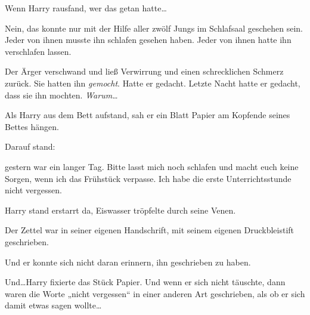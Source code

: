 Wenn Harry rausfand, wer das getan hatte…

Nein, das konnte nur mit der Hilfe aller zwölf Jungs im Schlafsaal geschehen sein. Jeder von ihnen musste ihn schlafen gesehen haben. Jeder von ihnen hatte ihn verschlafen lassen.

Der Ärger verschwand und ließ Verwirrung und einen schrecklichen Schmerz zurück. Sie hatten ihn \emph{gemocht}. Hatte er gedacht. Letzte Nacht hatte er gedacht, dass sie ihn mochten. \emph{Warum…}

Als Harry aus dem Bett aufstand, sah er ein Blatt Papier am Kopfende seines Bettes hängen.

Darauf stand:


\begin{writtenNote}

gestern war ein langer Tag. Bitte lasst mich noch schlafen und macht euch keine Sorgen, wenn ich das Frühstück verpasse. Ich habe die erste Unterrichtsstunde nicht vergessen.

\end{writtenNote}

Harry stand erstarrt da, Eiswasser tröpfelte durch seine Venen.

Der Zettel war in seiner eigenen Handschrift, mit seinem eigenen Druckbleistift geschrieben.

Und er konnte sich nicht daran erinnern, ihn geschrieben zu haben.

Und…Harry fixierte das Stück Papier. Und wenn er sich nicht täuschte, dann waren die Worte „nicht vergessen“ in einer anderen Art geschrieben, als ob er sich damit etwas sagen wollte…

